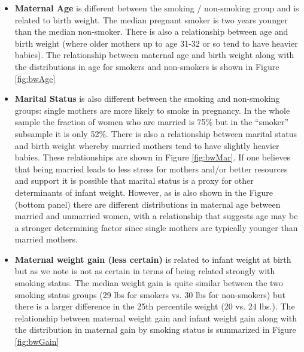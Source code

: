 \documentclass[a4paper, 12pt]{article}
\begin{document}
\begin{itemize}

\item \textbf{Maternal Age} is different between the smoking / non-smoking group and is related to birth weight.  The median pregnant smoker is two years younger than the median non-smoker.  There is also a relationship between age and birth weight (where older mothers up to age 31-32 or so tend to have heavier babies).  The relationship between maternal age and birth weight along with the distributions in age for smokers and non-smokers is shown in Figure \ref{fig:bwAge}

\item \textbf{Marital Status} is also different between the smoking and non-smoking groups: single mothers are more likely to smoke in pregnancy.  In the whole sample the fraction of women who are married is 75\% but in the ``smoker'' subsample it is only 52\%.  There is also a relationship between marital status and birth weight whereby married mothers tend to have slightly heavier babies.  These relationships are shown in Figure \ref{fig:bwMar}.  If one believes that being married leads to less stress for mothers and/or better resources and support it is possible that marital status is a proxy for other determinants of infant weight.  However, as is also shown in the Figure (bottom panel) there are different distributions in maternal age between married and unmarried women, with a relationship that suggests age may be a stronger determining factor since single mothers are typically younger than married mothers.   

\item \textbf{Maternal weight gain (less certain)} is related to infant weight at birth but as we note is not as certain in terms of being related strongly with smoking status.  The median weight gain is quite similar between the two smoking status groups (29 lbs for smokers vs. 30 lbs for non-smokers) but there is a larger difference in the 25th percentile weight (20 vs. 24 lbs.).  The relationship between maternal weight gain and infant weight gain along with the distribution in maternal gain by smoking status is summarized in Figure \ref{fig:bwGain}


\end{itemize}
\end{document}

